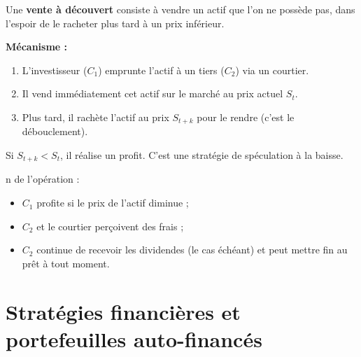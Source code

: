 \begin{tcolorbox}[title=Rappel : La vente à découvert (Short Selling), colback=blue!5!white, colframe=blue!40!black]
Une \textbf{vente à découvert} consiste à vendre un actif que l'on ne possède pas, dans l'espoir de le racheter plus tard à un prix inférieur.

\medskip
\textbf{Mécanisme :}
\begin{enumerate}
    \item L'investisseur ($C_1$) emprunte l'actif à un tiers ($C_2$) via un courtier.
    \item Il vend immédiatement cet actif sur le marché au prix actuel $S_t$.
    \item Plus tard, il rachète l'actif au prix $S_{t+k}$ pour le rendre (c'est le débouclement).
\end{enumerate}

Si $S_{t+k} < S_t$, il réalise un profit. C'est une stratégie de spéculation à la baisse.

\begin{center}
\end{center}
\end{tcolorbox}n de l'opération :
\begin{itemize}
  \item $C_1$ profite si le prix de l'actif diminue ;
  \item $C_2$ et le courtier perçoivent des frais ;
  \item $C_2$ continue de recevoir les dividendes (le cas échéant) et peut mettre fin au prêt à tout moment.
\end{itemize}


\section{Stratégies financières et portefeuilles auto-financés}

